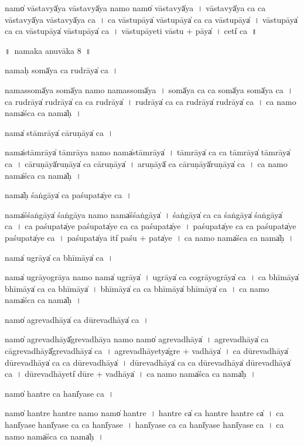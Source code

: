 \documentclass[parskip, DIV=14]{scrartcl}
\begin{document}
{namo̍ vāsta॒vyā̍ya vāsta॒vyā̍ya॒ namo॒ namo̍ vāsta॒vyā̍ya~।
vā॒sta॒vyā̍ya ca ca vāsta॒vyā̍ya vāsta॒vyā̍ya ca~।
ca॒ vā॒stu॒pāya̍ vāstu॒pāya̍ ca ca vāstu॒pāya̍~।
vā॒stu॒pāya̍ ca ca vāstu॒pāya̍ vāstu॒pāya̍ ca~।
vā॒stu॒pāyeti vāstu + pāya̍~।
ceti̍ ca~॥


\newpage
\LARGE
॥~namaka anuvāka 8~॥ 
\Large

nama॒ḥ somā̍ya ca ru॒drāya̍ ca॒~।

nama॒ssomā̍ya॒ somā̍ya॒ namo॒ nama॒ssomā̍ya~।
somā̍ya ca ca॒ somā̍ya॒ somā̍ya ca~।
ca॒ ru॒drāya̍ ru॒drāya̍ ca ca ru॒drāya̍~।
ru॒drāya̍ ca ca ru॒drāya̍ ru॒drāya̍ ca~।
ca॒ namo॒ nama̍śca ca॒ nama̍ḥ~।

nama̍ stā॒mrāya̍ cāru॒ṇāya̍ ca॒~।

nama̍stā॒mrāya̍ tā॒mrāya॒ namo॒ nama̍stā॒mrāya̍~।
tā॒mrāya̍ ca ca  tā॒mrāya̍ tā॒mrāya̍ ca~।
cā॒ru॒ṇāyā̍ru॒ṇāya̍ ca cāru॒ṇāya̍~। 
a॒ru॒ṇāyā̍ ca cāru॒ṇāyā̍ru॒ṇāya̍ ca~। 
ca॒ namo॒ nama̍śca ca॒ nama̍ḥ~।

nama̍ḥ śa॒ṅgāya̍ ca paśu॒pata̍ye ca॒~।

nama̍śśa॒ṅgāya̍ śa॒ṅgāya॒ namo॒ nama̍śśa॒ṅgāya̍~।
śa॒ṅgāya̍ ca ca śa॒ṅgāya̍ śa॒ṅgāya̍ ca~।
ca॒ pa॒śu॒pata̍ye paśu॒pata̍ye ca ca  paśu॒pata̍ye~।
pa॒śu॒pata̍ye ca ca paśu॒pata̍ye paśu॒pata̍ye ca~।
pa॒śu॒pata̍ya॒ iti̍ paśu + pata̍ye~।
ca॒ namo॒ nama̍śca ca॒ nama̍ḥ~।

nama̍ u॒grāya̍ ca bhī॒māya̍ ca॒~।

nama̍ u॒grāyo॒grāya॒ namo॒ nama̍ u॒grāya̍~।
u॒grāya̍ ca co॒grāyo॒grāya̍ ca~।
ca॒ bhī॒māya̍ bhī॒māya̍ ca ca bhī॒māya̍~।
bhī॒māya̍ ca ca bhī॒māya̍ bhī॒māya̍ ca~।
ca॒ namo॒ nama̍śca ca॒ nama̍ḥ~।

namo̍ agreva॒dhāya̍ ca dūreva॒dhāya̍ ca॒~।

namo̍ agreva॒dhāyā̎greva॒dhāya॒ namo॒ namo̍ agreva॒dhāya̍~।
a॒gre॒va॒dhāya̍ ca cāgreva॒dhāyā̎greva॒dhāya̍ ca~।
a॒gre॒va॒dhāyetya̍gre + va॒dhāya̍~।
ca॒ dū॒re॒va॒dhāya̍ dūreva॒dhāya̍ ca ca dūreva॒dhāya̍~।
dū॒re॒va॒dhāya̍ ca ca dūreva॒dhāya̍ dūreva॒dhāya̍ ca~।
dū॒re॒va॒dhāyeti̍ dūre + va॒dhāya̍~। 
ca॒ namo॒ nama̍śca ca॒ nama̍ḥ~।

namo̍ ha॒ntre ca॒ hanī̍yase ca॒~।

namo̍ ha॒ntre ha॒ntre namo॒ namo̍ ha॒ntre~।
ha॒ntre ca̍ ca ha॒ntre ha॒ntre ca̍~।
ca॒ hanī̍yase॒ hanī̍yase ca ca॒ hanī̍yase~।
hanī̍yase ca ca॒ hanī̍yase॒ hanī̍yase ca~।
ca॒ namo॒ nama̍śca ca॒ nama̍ḥ~।

}
\end{document}
